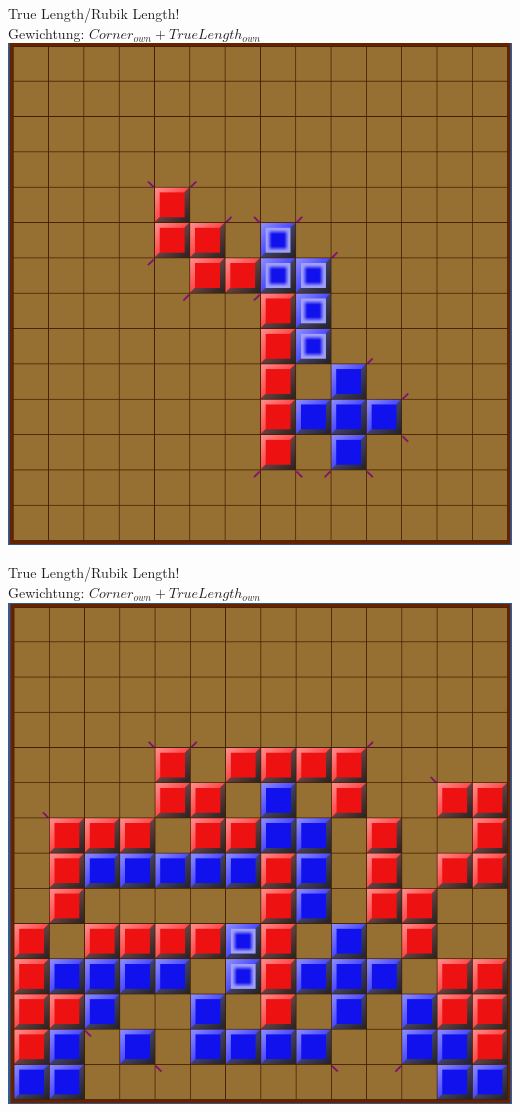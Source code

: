 \documentclass[12pt]{beamer}
\begin{document}
\begin{frame}
	True Length/Rubik Length!\\
	Gewichtung: $Corner_{own} + TrueLength_{own}$\\
	\pause
	\includegraphics[width=0.6\linewidth]{media/wgh8.png}
\end{frame}
\begin{frame}
	True Length/Rubik Length!\\
	Gewichtung: $Corner_{own} + TrueLength_{own}$\\
	\includegraphics[width=0.6\linewidth]{media/wgh9.png}
\end{frame}
\end{document}
